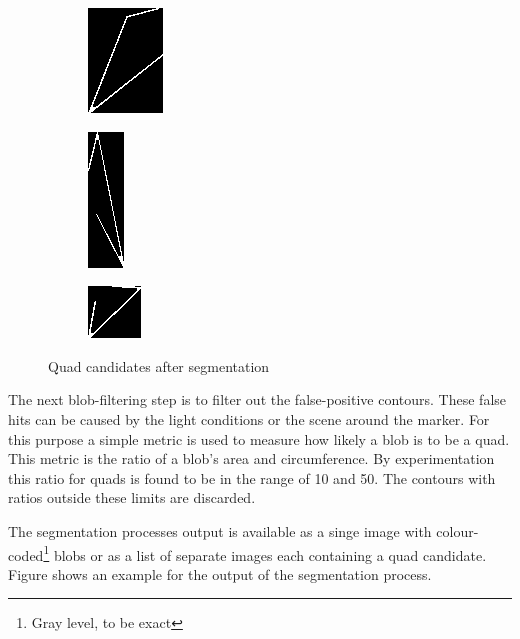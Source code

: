 \begin{figure}[ht]
	\begin{subfigure}{0.3\textwidth}
		\centering
		\includegraphics{figures/quad3.png}
	\end{subfigure}
	\begin{subfigure}{0.3\textwidth}
		\centering
		\includegraphics{figures/quad4.png}
	\end{subfigure}
	\begin{subfigure}{0.3\textwidth}
		\centering
		\includegraphics{figures/quad5.png}
	\end{subfigure}
	\caption{Quad candidates after segmentation}
	\label{fig:segmentationOutput}
\end{figure}

The next blob-filtering step is to filter out the false-positive contours.
These false hits can be caused by the light conditions or the scene around the marker.
For this purpose a simple metric is used to measure how likely a blob is to be a quad. 
This metric is the ratio of a blob's area and circumference. 
By experimentation this ratio for quads is found to be in the range of 10 and 50.
The contours with ratios outside these limits are discarded.

The segmentation processes output is available as a singe image with colour-coded\footnote{Gray level, to be exact} blobs or as a list of separate images each containing a quad candidate.
Figure  shows an example for the output of the segmentation process.